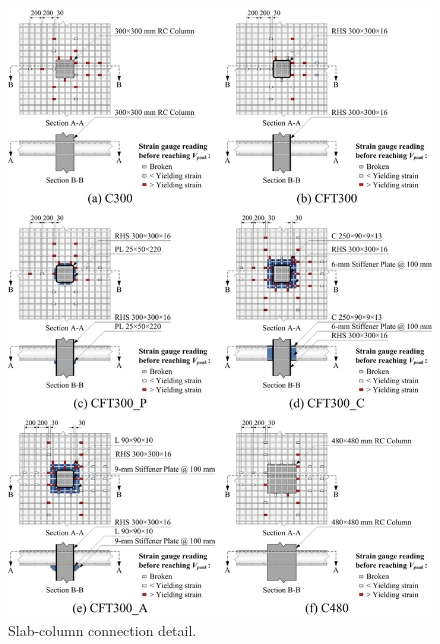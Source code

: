 \documentclass[twocolumn]{article} %
\begin{document}
\begin{figure}\centering
    \includegraphics[width=\columnwidth]{Figures/c2020f3.pdf}
    \caption{Slab-column connection detail\citep{chen2020}.}
    \label{c2020f3}
    \end{figure}
\end{document}

